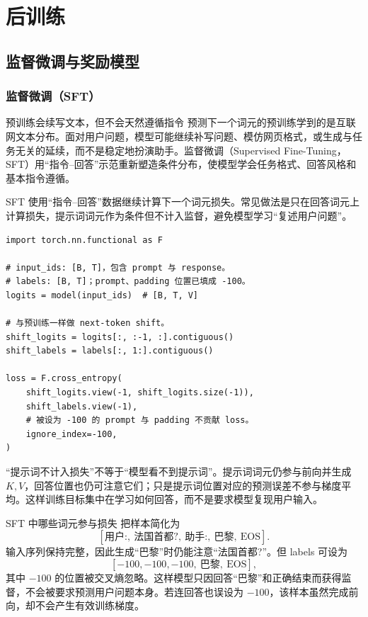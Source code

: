 \part{后训练}

\chapter{监督微调与奖励模型}

\figRLHFStages

\section{监督微调（SFT）}
\label{sec:sft}

\begin{motivationbox}{预训练会续写文本，但不会天然遵循指令}
预测下一个词元的预训练学到的是互联网文本分布。面对用户问题，模型可能继续补写问题、模仿网页格式，或生成与任务无关的延续，而不是稳定地扮演助手。监督微调（Supervised Fine-Tuning，SFT）用“指令--回答”示范重新塑造条件分布，使模型学会任务格式、回答风格和基本指令遵循。
\end{motivationbox}

SFT 使用“指令--回答”数据继续计算下一个词元损失。常见做法是只在回答词元上计算损失，提示词词元作为条件但不计入监督，避免模型学习“复述用户问题”。

\begin{lstlisting}
import torch.nn.functional as F

# input_ids: [B, T]，包含 prompt 与 response。
# labels: [B, T]；prompt、padding 位置已填成 -100。
logits = model(input_ids)  # [B, T, V]

# 与预训练一样做 next-token shift。
shift_logits = logits[:, :-1, :].contiguous()
shift_labels = labels[:, 1:].contiguous()

loss = F.cross_entropy(
    shift_logits.view(-1, shift_logits.size(-1)),
    shift_labels.view(-1),
    # 被设为 -100 的 prompt 与 padding 不贡献 loss。
    ignore_index=-100,
)
\end{lstlisting}

“提示词不计入损失”不等于“模型看不到提示词”。提示词词元仍参与前向并生成 $K,V$，回答位置也仍可注意它们；只是提示词位置对应的预测误差不参与梯度平均。这样训练目标集中在学习如何回答，而不是要求模型复现用户输入。

\begin{examplebox}{SFT 中哪些词元参与损失}
把样本简化为
\[
[\text{用户:},\ \text{法国首都?},\ \text{助手:},\ \text{巴黎},\ \mathrm{EOS}].
\]
输入序列保持完整，因此生成“巴黎”时仍能注意“法国首都?”。但 labels 可设为
\[
[-100,-100,-100,\ \text{巴黎},\ \mathrm{EOS}],
\]
其中 $-100$ 的位置被交叉熵忽略。这样模型只因回答“巴黎”和正确结束而获得监督，不会被要求预测用户问题本身。若连回答也误设为 $-100$，该样本虽然完成前向，却不会产生有效训练梯度。
\end{examplebox}

